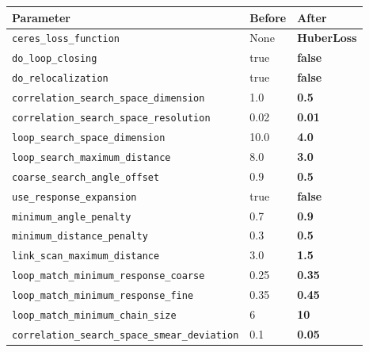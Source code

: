 \documentclass[11pt]{article}
\begin{document}
\begin{center}
\begin{tabular}{lll}
\textbf{Parameter} & \textbf{Before} & \textbf{After} \\
\hline
\texttt{ceres\_loss\_function} & None & \textbf{HuberLoss} \\
\texttt{do\_loop\_closing} & true & \textbf{false} \\
\texttt{do\_relocalization} & true & \textbf{false} \\
\texttt{correlation\_search\_space\_dimension} & 1.0 & \textbf{0.5} \\
\texttt{correlation\_search\_space\_resolution} & 0.02 & \textbf{0.01} \\
\texttt{loop\_search\_space\_dimension} & 10.0 & \textbf{4.0} \\
\texttt{loop\_search\_maximum\_distance} & 8.0 & \textbf{3.0} \\
\texttt{coarse\_search\_angle\_offset} & 0.9 & \textbf{0.5} \\
\texttt{use\_response\_expansion} & true & \textbf{false} \\
\texttt{minimum\_angle\_penalty} & 0.7 & \textbf{0.9} \\
\texttt{minimum\_distance\_penalty} & 0.3 & \textbf{0.5} \\
\texttt{link\_scan\_maximum\_distance} & 3.0 & \textbf{1.5} \\
\texttt{loop\_match\_minimum\_response\_coarse} & 0.25 & \textbf{0.35} \\
\texttt{loop\_match\_minimum\_response\_fine} & 0.35 & \textbf{0.45} \\
\texttt{loop\_match\_minimum\_chain\_size} & 6 & \textbf{10} \\
\texttt{correlation\_search\_space\_smear\_deviation} & 0.1 & \textbf{0.05} \\
\end{tabular}
\end{center}
\end{document}
